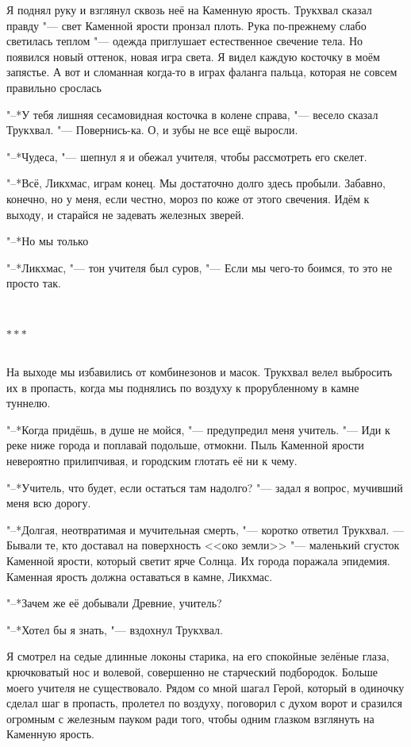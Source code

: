 \documentclass[a4paper,10pt]{book}
\newcommand{\ldotst}{\so{...}\xspace}
\newcommand{\razd}{~\\{\centering\Large\bfseries$\ast \ast \ast$\par}~\\}
\begin{document}
Я поднял руку и взглянул сквозь неё на Каменную ярость. Трукхвал сказал правду 
"--- свет Каменной ярости пронзал плоть. Рука по-прежнему слабо светилась 
теплом "--- одежда приглушает естественное свечение тела. Но появился новый 
оттенок, новая игра света. Я видел каждую косточку в моём запястье. А вот и 
сломанная когда-то в играх фаланга пальца, которая не совсем правильно 
срослась\ldotst

"--*У тебя лишняя сесамовидная косточка в колене справа, "--- весело сказал 
Трукхвал. "--- Повернись-ка. О, и зубы не все ещё выросли.

"--*Чудеса, "--- шепнул я и обежал учителя, чтобы рассмотреть его скелет.

"--*Всё, Ликхмас, играм конец. Мы достаточно долго здесь пробыли. Забавно, 
конечно, но у меня, если честно, мороз по коже от этого свечения. Идём к 
выходу, и старайся не задевать железных зверей.

"--*Но мы только\ldotst

"--*Ликхмас, "--- тон учителя был суров, "--- Если мы чего-то боимся, то это не 
просто так.

\razd

На выходе мы избавились от комбинезонов и масок. Трукхвал велел выбросить их в 
пропасть, когда мы поднялись по воздуху к прорубленному в камне туннелю.

"--*Когда придёшь, в душе не мойся, "--- предупредил меня учитель. "--- Иди к 
реке ниже города и поплавай подольше, отмокни. Пыль Каменной ярости невероятно 
прилипчивая, и городским глотать её ни к чему.

"--*Учитель, что будет, если остаться там надолго? "--- задал я вопрос, 
мучивший меня всю дорогу.

"--*Долгая, неотвратимая и мучительная смерть, "--- коротко ответил Трукхвал. 
--- Бывали те, кто доставал на поверхность <<око земли>> "--- маленький сгусток 
Каменной ярости, который светит ярче Солнца. Их города поражала эпидемия. 
Каменная ярость должна оставаться в камне, Ликхмас.

"--*Зачем же её добывали Древние, учитель?

"--*Хотел бы я знать, "--- вздохнул Трукхвал.

Я смотрел на седые длинные локоны старика, на его спокойные зелёные глаза, 
крючковатый нос и волевой, совершенно не старческий подбородок. Больше моего 
учителя не существовало. Рядом со мной шагал Герой, который в одиночку сделал 
шаг в пропасть, пролетел по воздуху, поговорил с духом ворот и сразился 
огромным с железным пауком ради того, чтобы одним глазком взглянуть на Каменную 
ярость.
\end{document}
